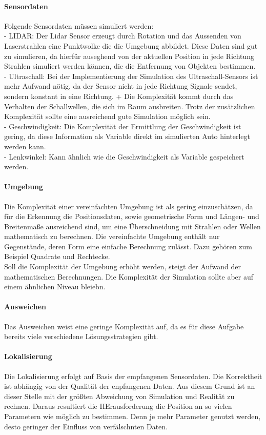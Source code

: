 \paragraph{Sensordaten}
Folgende Sensordaten müssen simuliert werden: \\
- LIDAR: Der Lidar Sensor erzeugt durch Rotation und das Aussenden von Laserstrahlen eine Punktwolke die die Umgebung abbildet.
 Diese Daten sind gut zu simulieren, da hierfür auseghend von der aktuellen Position in jede Richtung Strahlen simuliert werden können, die die Entfernung von Objekten bestimmen. \\
- Ultraschall: Bei der Implementierung der Simulation des Ultraschall-Sensors ist mehr Aufwand nötig, da der Sensor nicht in jede Richtung Signale sendet, sondern konstant in eine Richtung. +
Die Komplexität kommt durch das Verhalten der Schallwellen, die sich im Raum ausbreiten. Trotz der zusätzlichen Komplexität sollte eine ausreichend gute Simulation möglich sein.\\
- Geschwindigkeit: Die Komplexität der Ermittlung der Geschwindigkeit ist gering, da diese Information als Variable direkt im simulierten Auto hinterlegt werden kann.\\
- Lenkwinkel: Kann ähnlich wie die Geschwindigkeit als Variable gespeichert werden. 

\paragraph{Umgebung}
Die Komplexität einer vereinfachten Umgebung ist als gering einzuschätzen, da für die Erkennung die Positionsdaten, sowie geometrische Form und Längen- und Breitenmaße ausreichend sind, um eine Überschneidung mit Strahlen oder Wellen mathematisch zu berechnen.
Die vereinfachte Umgebung enthält nur Gegenstände, deren Form eine einfache Berechnung zulässt. Dazu gehören zum Beispiel Quadrate und Rechtecke. \\
Soll die Komplexität der Umgebung erhöht werden, steigt der Aufwand der mathematischen Berechnungen. Die Komplexität der Simulation sollte aber auf einem ähnlichen Niveau bleiebn.

\paragraph{Ausweichen}
Das Ausweichen weist eine geringe Komplexität auf, da es für diese Aufgabe bereits viele verschiedene Lösungsstrategien gibt. 

\paragraph{Lokalisierung}
Die Lokalisierung erfolgt auf Basis der empfangenen Sensordaten. Die Korrektheit ist abhängig von der Qualität der enpfangenen Daten.
Aus diesem Grund ist an dieser Stelle mit der größten Abweichung von Simulation und Realität zu rechnen. Daraus resultiert die HErausforderung die Position an so vielen Parametern wie möglich zu bestimmen.
Denn je mehr Parameter genutzt werden, desto geringer der Einfluss von verfälschnten Daten. 

